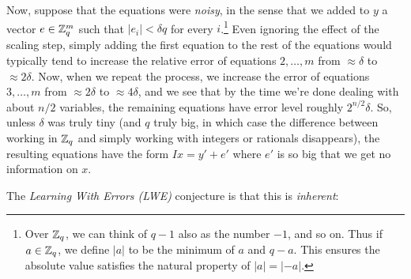 Now, suppose that the equations were \emph{noisy}, in the sense that we
added to \(y\) a vector \(e\in{\mathbb{Z}}_q^m\) such that \(|e_i|<\delta q\) for
every \(i\).\footnote{Over \({\mathbb{Z}}_q\), we can think of \(q-1\) also as the
  number \(-1\), and so on. Thus if \(a\in{\mathbb{Z}}_q\), we define \(|a|\) to
  be the minimum of \(a\) and \(q-a\). This ensures the absolute value
  satisfies the natural property of \(|a|=|-a|\).} Even ignoring the
effect of the scaling step, simply adding the first equation to the rest
of the equations would typically tend to increase the relative error of
equations \(2,\ldots,m\) from \(\approx \delta\) to \(\approx 2\delta\).
Now, when we repeat the process, we increase the error of equations
\(3,\ldots,m\) from \(\approx 2\delta\) to \(\approx 4\delta\), and we
see that by the time we're done dealing with about \(n/2\) variables,
the remaining equations have error level roughly \(2^{n/2}\delta\). So,
unless \(\delta\) was truly tiny (and \(q\) truly big, in which case the
difference between working in \({\mathbb{Z}}_q\) and simply working with integers
or rationals disappears), the resulting equations have the form
\(Ix = y' + e'\) where \(e'\) is so big that we get no information on
\(x\).

The \emph{Learning With Errors (LWE)} conjecture is that this is
\emph{inherent}:

